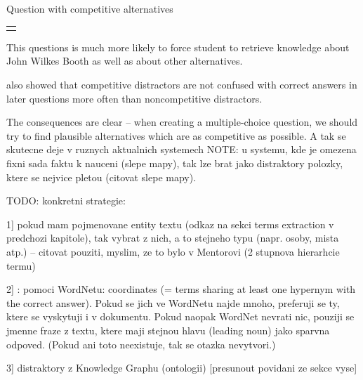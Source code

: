 \documentclass[a4paper, 12pt, twoside]{fithesis2}		%
\renewcommand{\_}{\leavevmode \kern0.0em\vbox{\hrule width0.4em}}
\newcounter{choice}
\renewcommand\thechoice{\Alph{choice}}
\newcommand\choicelabel{\thechoice.}
\newenvironment{choices}%
  {\vspace{0.8em}\list{\choicelabel}%
     {\usecounter{choice}\def\makelabel##1{\hss\llap{##1}}%
       \settowidth{\leftmargin}{W.\hskip\labelsep\hskip 0.01em}%
       \def\choice{%
         \item
       } %
       \labelwidth\leftmargin\advance\labelwidth-\labelsep
       \topsep=0pt
       \partopsep=0pt
     }%
  }%
  {\vspace{-0.7em}\endlist}
\newenvironment{question}
{
  \begin{center}
  \begin{tabular}{p{0.9\textwidth}}
  \vskip 0.05em
}
{
  \\
  \end{tabular}
  \end{center}
}
\newcommand{\sentenceGap}{\rule{1.5cm}{0.4pt}~}
\begin{document}
\begin{exercise}
\caption{Question with competitive alternatives}%
  \begin{question}
  Lincoln was assassinated by \sentenceGap , a Confederate sympathizer.
  \begin{choices}
    \choice Thomas N. Conrad
    \choice Robert E. Lee
    \choice John Wilkes Booth
    \choice Ward Hill Lamon
  \end{choices}
  \end{question}
\end{exercise}

This questions is much more likely to force student to retrieve knowledge about John Wilkes Booth as well as about other alternatives.

\cite{optimizing-multiple-choice} also showed that competitive distractors are not confused with correct answers in later questions more often than noncompetitive distractors.

The consequences are clear -- when creating a multiple-choice question, we should try to find plausible alternatives which are as competitive as possible.
A tak se skutecne deje v ruznych aktualnich systemech \cite{question-gen-mitkov, slepe-mapy}
NOTE: u systemu, kde je omezena fixni sada faktu k nauceni (slepe mapy), tak lze brat jako distraktory polozky, ktere se nejvice pletou (citovat slepe mapy).

TODO: konkretni strategie:

1] pokud mam pojmenovane entity textu (odkaz na sekci terms extraction v predchozi kapitole), tak vybrat z nich, a to stejneho typu (napr. osoby, mista atp.) -- citovat pouziti, myslim, ze to bylo v Mentorovi (2 stupnova hierarhcie termu)

2] \cite{question-gen-mitkov}:
pomoci WordNetu: coordinates (= terms sharing at least one hypernym with the correct answer). Pokud se jich ve WordNetu najde mnoho, preferuji se ty, ktere se vyskytuji i v dokumentu. Pokud naopak WordNet nevrati nic, pouziji se jmenne fraze z textu, ktere maji stejnou hlavu (leading noun) jako sparvna odpoved. (Pokud ani toto neexistuje, tak se otazka nevytvori.)


3] distraktory z Knowledge Graphu (ontologii) [presunout povidani ze sekce vyse]




\end{document}
